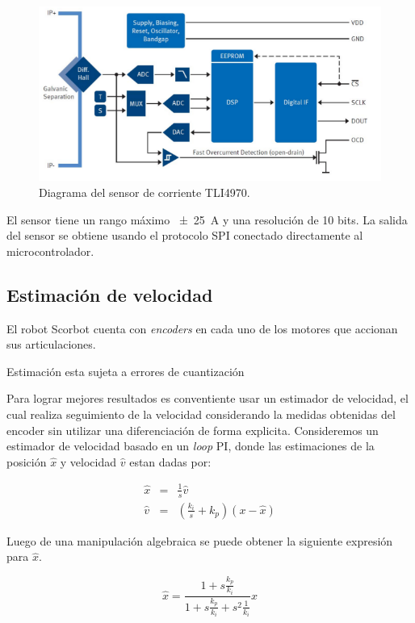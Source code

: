 \begin{figure}[H]
  \centering
  \includegraphics[scale=.45]{img/cap3/tli4970}
  \caption{Diagrama del sensor de corriente TLI4970.}
  \label{cap3_tli4970}
\end{figure}

El sensor tiene un rango máximo \SI{\pm 25}{\ampere} y una resolución de 10 bits. La salida del sensor se obtiene usando el protocolo SPI conectado directamente al microcontrolador.

\subsection{Estimación de velocidad}

El robot Scorbot cuenta con \textit{encoders} en cada uno de los motores que accionan sus articulaciones.

Estimación esta sujeta a errores de cuantización

Para lograr mejores resultados es conventiente usar un estimador de velocidad, el cual realiza seguimiento de la velocidad considerando la medidas obtenidas del encoder sin utilizar una diferenciación de forma explicita. Consideremos un estimador de velocidad basado en un \textit{loop} PI, donde las estimaciones de la posición $\hat{x}$ y velocidad $\hat{v}$ estan dadas por:

\begin{eqnarray}
\hat{x} &=& \frac{1}{s} \hat{v} \\
\hat{v} &=& \left( \frac{k_i}{s} + k_p \right) (x-\hat{x})
\end{eqnarray}

Luego de una manipulación algebraica se puede obtener la siguiente expresión para $\hat{x}$.

\begin{equation}
\hat{x} = \frac{1+s\frac{k_p}{k_i}}{1+s\frac{k_p}{k_i}+s^2\frac{1}{k_i}}x
\end{equation}

